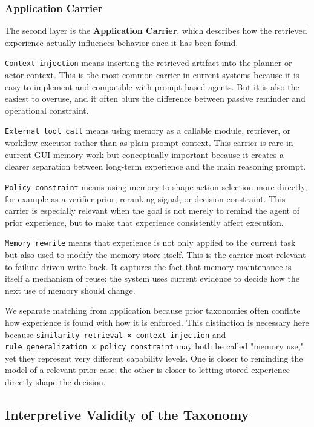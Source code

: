 \documentclass{article}
\begin{document}
\subsubsection{Application Carrier}\label{432-application-carrier}

The second layer is the \textbf{Application Carrier}, which describes
how the retrieved experience actually influences behavior once it has
been found.

\texttt{Context\ injection} means inserting the retrieved artifact into
the planner or actor context. This is the most common carrier in current
systems because it is easy to implement and compatible with prompt-based
agents. But it is also the easiest to overuse, and it often blurs the
difference between passive reminder and operational constraint.

\texttt{External\ tool\ call} means using memory as a callable module,
retriever, or workflow executor rather than as plain prompt context.
This carrier is rare in current GUI memory work but conceptually
important because it creates a clearer separation between long-term
experience and the main reasoning prompt.

\texttt{Policy\ constraint} means using memory to shape action selection
more directly, for example as a verifier prior, reranking signal, or
decision constraint. This carrier is especially relevant when the goal
is not merely to remind the agent of prior experience, but to make that
experience consistently affect execution.

\texttt{Memory\ rewrite} means that experience is not only applied to
the current task but also used to modify the memory store itself. This
is the carrier most relevant to failure-driven write-back. It captures
the fact that memory maintenance is itself a mechanism of reuse: the
system uses current evidence to decide how the next use of memory should
change.

We separate matching from application because prior taxonomies often
conflate how experience is found with how it is enforced. This
distinction is necessary here because
\texttt{similarity\ retrieval\ ×\ context\ injection} and
\texttt{rule\ generalization\ ×\ policy\ constraint} may both be called
"memory use," yet they represent very different capability levels. One
is closer to reminding the model of a relevant prior case; the other is
closer to letting stored experience directly shape the decision.

\subsection{Interpretive Validity of the Taxonomy}\label{44-interpretive-validity-of-the-taxonomy}
\end{document}

